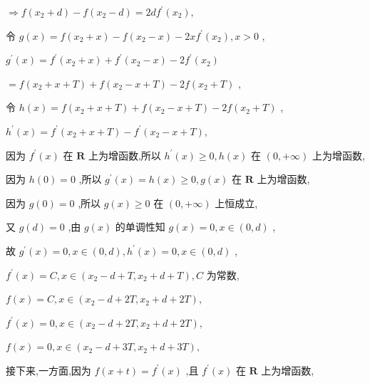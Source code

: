 \documentclass[10pt]{article}
\begin{document}
\(\Rightarrow  f\left( {{x}_{2} + d}\right)  - f\left( {{x}_{2} - d}\right)  = {2d}{f}^{\prime }\left( {x}_{2}\right) ,\)

令 \(g\left( x\right)  = f\left( {{x}_{2} + x}\right)  - f\left( {{x}_{2} - x}\right)  - {2x}{f}^{\prime }\left( {x}_{2}\right) ,x > 0\) ,

\({g}^{\prime }\left( x\right)  = {f}^{\prime }\left( {{x}_{2} + x}\right)  + {f}^{\prime }\left( {{x}_{2} - x}\right)  - 2{f}^{\prime }\left( {x}_{2}\right)\)

\(= f\left( {{x}_{2} + x + T}\right)  + f\left( {{x}_{2} - x + T}\right)  - {2f}\left( {{x}_{2} + T}\right)\) ,

令 \(h\left( x\right)  = f\left( {{x}_{2} + x + T}\right)  + f\left( {{x}_{2} - x + T}\right)  - {2f}\left( {{x}_{2} + T}\right)\) ,

\({h}^{\prime }\left( x\right)  = {f}^{\prime }\left( {{x}_{2} + x + T}\right)  - {f}^{\prime }\left( {{x}_{2} - x + T}\right) ,\)

因为 \({f}^{\prime }\left( x\right)\) 在 \(\mathbf{R}\) 上为增函数,所以 \({h}^{\prime }\left( x\right)  \geq  0,h\left( x\right)\) 在 \(\left( {0, + \infty }\right)\) 上为增函数,

因为 \(h\left( 0\right)  = 0\) ,所以 \({g}^{\prime }\left( x\right)  = h\left( x\right)  \geq  0,g\left( x\right)\) 在 \(\mathbf{R}\) 上为增函数,

因为 \(g\left( 0\right)  = 0\) ,所以 \(g\left( x\right)  \geq  0\) 在 \(\left( {0, + \infty }\right)\) 上恒成立,

又 \(g\left( d\right)  = 0\) ,由 \(g\left( x\right)\) 的单调性知 \(g\left( x\right)  = 0,x \in  \left( {0,d}\right)\) ,

故 \({g}^{\prime }\left( x\right)  = 0,x \in  \left( {0,d}\right) ,{h}^{\prime }\left( x\right)  = 0,x \in  \left( {0,d}\right)\) ,

\({f}^{\prime }\left( x\right)  = C,x \in  \left( {{x}_{2} - d + T,{x}_{2} + d + T}\right) ,C\) 为常数,

\(f\left( x\right)  = C,x \in  \left( {{x}_{2} - d + {2T},{x}_{2} + d + {2T}}\right) ,\)

\({f}^{\prime }\left( x\right)  = 0,x \in  \left( {{x}_{2} - d + {2T},{x}_{2} + d + {2T}}\right) ,\)

\(f\left( x\right)  = 0,x \in  \left( {{x}_{2} - d + {3T},{x}_{2} + d + {3T}}\right) ,\)

接下来,一方面,因为 \(f\left( {x + t}\right)  = {f}^{\prime }\left( x\right)\) ,且 \({f}^{\prime }\left( x\right)\) 在 \(\mathbf{R}\) 上为增函数,
\end{document}
